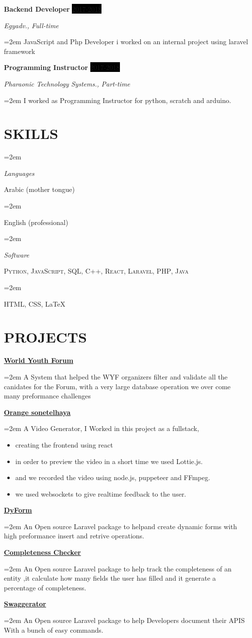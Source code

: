 \documentclass[paper=a4,fontsize=11pt]{scrartcl} %
\newlength{\spacebox}
\newcommand{\sepspace}{\vspace*{1em}}		%
\newcommand{\NewPart}[1]{\section*{\uppercase{#1}}}
\newcommand{\PersonalEntry}[2]{
		\noindent\hangindent=2em\hangafter=0 %
		\parbox{\spacebox}{        %
		\textit{#1}}		       %
		\hspace{1.5em} #2 \par}    %
\newcommand{\SkillsEntry}[2]{      %
		\noindent\hangindent=2em\hangafter=0 %
		\parbox{\spacebox}{        %
		\textit{#1}}			   %
		\hspace{1.5em} #2 \par}    %
\newcommand{\EducationEntry}[4]{
		\noindent \textbf{#1} \hfill      %
		\colorbox{Black}{%
			\parbox{6em}{%
			\hfill\color{White}#2}} \par  %
		\noindent \textit{#3} \par        %
		\noindent\hangindent=2em\hangafter=0 \small #4 %
		\normalsize \par}
\newcommand{\WorkEntry}[4]{				  %
		\noindent \textbf{#1} \hfill      %
		\colorbox{Black}{\color{White}#2} \par  %
		\noindent \textit{#3} \par              %
		\noindent\hangindent=2em\hangafter=0 \small #4 %
		\normalsize \par}
\newcommand{\ProjectEntry}[2]{
		\noindent \textbf{#1} \hfill      %
		
		\noindent\hangindent=2em\hangafter=0 \small #2 %
		\normalsize \par}
\begin{document}
\WorkEntry{Backend Developer}{2017-2018}{Egyadv., Full-time}{JavaScript and Php Developer i worked on an internal project using laravel framework }

\sepspace
\WorkEntry{Programming Instructor}{2017-2018}{Pharaonic Technology Systems., Part-time}{I worked as Programming Instructor for python, scratch and arduino.}
\NewPart{Skills}{
\SkillsEntry{Languages}{Arabic (mother tongue)}
\SkillsEntry{}{English (professional)}


\SkillsEntry{Software}{\textsc{Python}, \textsc{JavaScript},  \textsc{SQL}, \textsc{C++}, \textsc{React}, \textsc{Laravel}, \textsc{PHP}, \textsc{Java}}
}
\SkillsEntry{}{\textsc{HTML}, \textsc{CSS}, \LaTeX}



\NewPart{projects}{
\ProjectEntry{\href{https://wyfegypt.com/}{World Youth Forum}}{A System that helped the WYF organizers filter and validate all the canidates for the Forum, with a very large database operation we over come many preformance challenges}
\ProjectEntry{\href{https://orange-sonetelhaya.com/}{Orange sonetelhaya}}{A Video Generator, I Worked in this project as a fullstack, 
\begin{itemize}
 \item creating the frontend using react
 \item in order to preview the video in a short time we used Lottie.js.
 \item and we recorded the video using node.js, puppeteer and FFmpeg.
 \item we used websockets to give realtime feedback to the user.
\end{itemize}
}

\ProjectEntry{\href{https://github.com/peter44322/dy-form}{DyForm}}{An Open source Laravel package to helpand  create dynamic forms with high preformance insert and retrive operations.}
}

\ProjectEntry{\href{https://github.com/peter44322/laravel-completeness-checker}{Completeness Checker}}{An Open source Laravel package to help track the completeness of an entity ,it calculate how many fields the user has filled and it generate a percentage of completeness.}

\ProjectEntry{\href{https://github.com/peter44322/Swaggerator}{Swaggerator}}{An Open source Laravel package to help  Developers document their APIS With a bunch of easy commands.}
\end{document}
